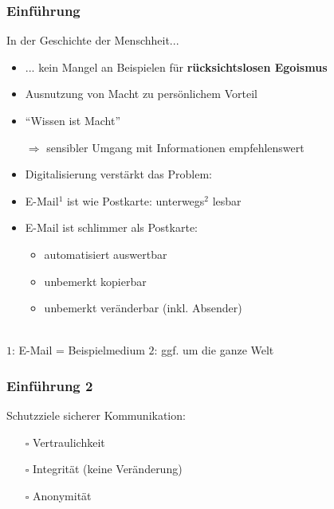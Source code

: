 \documentclass{beamer}
\begin{document}
\begin{frame}[label=ef1]
  \frametitle{Einführung }
  In der Geschichte der Menschheit...
  \begin{itemize}
   \item  ... kein Mangel an Beispielen für \textbf{rücksichtslosen Egoismus}
   \item Ausnutzung von Macht zu persönlichem Vorteil
   \pause
   \item "`Wissen ist Macht"'
   
   \item[$\Rightarrow$] sensibler Umgang mit Informationen empfehlenswert\\[2mm]
   
   \pause
   \item Digitalisierung verstärkt das Problem:
   \item E-Mail${}^1$ ist wie Postkarte: unterwegs${}^{2}$ lesbar
   \item E-Mail ist schlimmer als Postkarte:
   \begin{itemize}
    \item automatisiert auswertbar
    \item unbemerkt kopierbar
    \item unbemerkt veränderbar (inkl. Absender)
   \end{itemize}

  \end{itemize}
  
  ~\\[5mm]
  {\tiny $1$: E-Mail = Beispielmedium \qquad $2$: ggf. um die ganze Welt }

\end{frame}


\begin{frame}[label=ef2]

  \frametitle{Einführung 2}

Schutzziele sicherer Kommunikation:
  \begin{itemize}
   \item[$\square$] Vertraulichkeit
   
   \item[$\square$] Integrität (keine Veränderung)
   
   \item[$\square$] Anonymität
  \end{itemize}

\end{frame}
 
\end{document}
